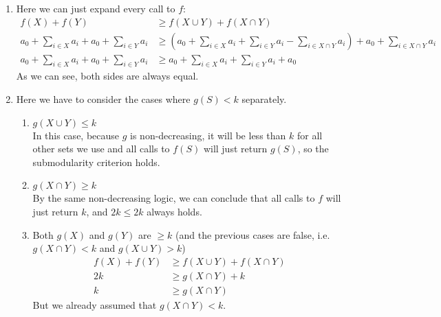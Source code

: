 \documentclass{article}
\begin{document}
  \begin{enumerate}[label=(\roman*)]
    \item Here we can just expand every call to $f$:
    \begin{align*}
      f(X) + f(Y) &\geq f(X \cup Y) + f(X \cap Y) \\
      a_0 + \sum_{i\in X} a_i + a_0 + \sum_{i\in Y} a_i &\geq \left(a_0 + \sum_{i\in X} a_i + \sum_{i\in Y} a_i - \sum_{i\in X \cap Y} a_i \right) + a_0 + \sum_{i\in X \cap Y} a_i \\
      a_0 + \sum_{i\in X} a_i + a_0 + \sum_{i\in Y} a_i &\geq a_0 + \sum_{i\in X} a_i + \sum_{i\in Y} a_i + a_0
    \end{align*}
    As we can see, both sides are always equal.

    \item Here we have to consider the cases where $g(S) < k$ separately.
    \begin{enumerate}[label=Case \arabic*:]
      \item $g(X \cup Y) \leq k$ \\
      In this case, because $g$ is non-decreasing, it will be less than $k$ for all other sets we use
      and all calls to $f(S)$ will just return $g(S)$, so the submodularity criterion holds.

      \item $g(X \cap Y) \geq k$ \\
      By the same non-decreasing logic, we can conclude that all calls to $f$ will just return $k$, and $2k \leq 2k$ always holds.

      \item Both $g(X)$ and $g(Y)$ are $\geq k$ (and the previous cases are false, i.e. $g(X \cap Y) < k$ and $g(X \cup Y) > k$)
      \begin{align*}
        f(X) + f(Y) &\geq f(X \cup Y) + f(X \cap Y) \\
        2k &\geq g(X \cap Y) + k \\
        k &\geq g(X \cap Y)
      \end{align*}
      But we already assumed that $g(X \cap Y) < k$.


\end{enumerate}
\end{enumerate}
\end{document}
